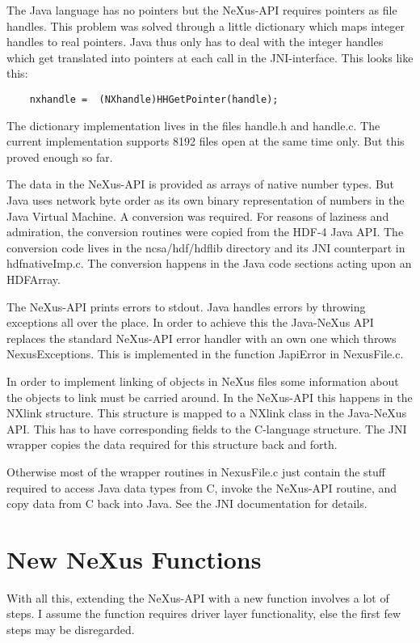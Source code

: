 \documentclass[a4paper]{article}
\begin{document}
The Java language has no pointers but the NeXus-API requires pointers as file handles. This 
problem was solved through a little dictionary which maps integer handles to real  pointers.
Java thus only has to deal with the integer handles which get translated into pointers at 
each call in the JNI-interface. This looks like this:
\begin{verbatim}
    nxhandle =  (NXhandle)HHGetPointer(handle);
\end{verbatim}  
The dictionary implementation lives in the files handle.h and handle.c. The current implementation 
supports 8192 files open at the same time only. But this proved enough so far. 


The data in the NeXus-API is provided as arrays of native number types. But Java uses network byte 
order as its own binary representation of numbers in the Java Virtual Machine. A conversion was 
required. For reasons of laziness and admiration, the conversion routines were copied from the 
HDF-4 Java API. The conversion code lives in the  ncsa/hdf/hdflib directory and its JNI 
counterpart in hdfnativeImp.c. The conversion happens in the Java code sections acting upon 
an HDFArray.


The NeXus-API prints errors to stdout. Java handles errors by throwing exceptions all over the 
place. In order to achieve this the Java-NeXus API replaces the standard NeXus-API error handler 
with an own one which throws NexusExceptions. This is implemented in the function JapiError in
NexusFile.c.


In order to implement linking of objects in NeXus files some information about the objects to link 
must be carried around. In the NeXus-API this happens in the NXlink structure. This structure is 
mapped to a NXlink class in the Java-NeXus API. This has to have corresponding fields to the 
C-language structure. The JNI wrapper copies the data required for this structure back and forth.


Otherwise most of the wrapper routines in NexusFile.c just contain the stuff required to access 
Java data types from C, invoke the NeXus-API routine, and copy data from C back into Java. See the 
JNI documentation for details. 


\section{New NeXus Functions }
With all this, extending the NeXus-API with a new function involves a lot of steps. I assume the function 
requires driver layer functionality, else the first few steps may be disregarded.
\end{document}
